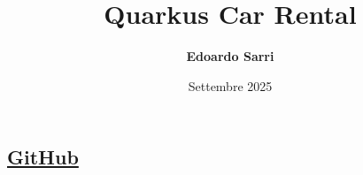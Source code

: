 \title{Quarkus Car Rental}
\subsection{\href{https://github.com/edoardosarri24/quarkus-car-rental}{GitHub}}
\author[Edoardo Sarri]{\textbf{Edoardo Sarri}}
\date{Settembre 2025}
